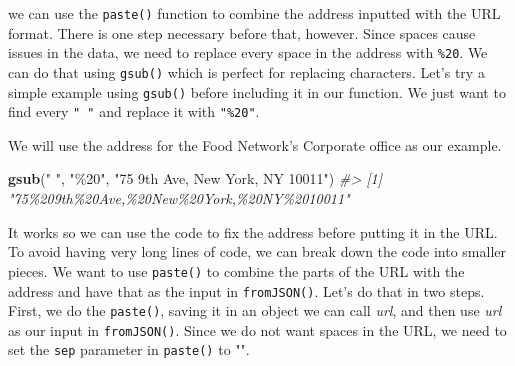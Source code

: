 \documentclass[
  12pt,
]{book}
\newenvironment{Shaded}{\begin{snugshade}}{\end{snugshade}}
\newcommand{\CommentTok}[1]{\textcolor[rgb]{0.37,0.37,0.37}{\textit{#1}}}
\newcommand{\ControlFlowTok}[1]{\textcolor[rgb]{0.27,0.27,0.27}{\textbf{#1}}}
\newcommand{\DataTypeTok}[1]{\textcolor[rgb]{0.27,0.27,0.27}{#1}}
\newcommand{\DecValTok}[1]{\textcolor[rgb]{0.06,0.06,0.06}{#1}}
\newcommand{\KeywordTok}[1]{\textcolor[rgb]{0.27,0.27,0.27}{\textbf{#1}}}
\newcommand{\NormalTok}[1]{#1}
\newcommand{\OperatorTok}[1]{\textcolor[rgb]{0.43,0.43,0.43}{\textbf{#1}}}
\newcommand{\StringTok}[1]{\textcolor[rgb]{0.5,0.5,0.5}{#1}}
\begin{document}
we can use the \texttt{paste()} function to combine the address inputted with the URL format. There is one step necessary before that, however. Since spaces cause issues in the data, we need to replace every space in the address with \texttt{\%20}. We can do that using \texttt{gsub()} which is perfect for replacing characters. Let's try a simple example using \texttt{gsub()} before including it in our function. We just want to find every \texttt{"\ "} and replace it with \texttt{"\%20"}.

We will use the address for the Food Network's Corporate office as our example.

\begin{Shaded}
\begin{Highlighting}[]
\KeywordTok{gsub}\NormalTok{(}\StringTok{" "}\NormalTok{, }\StringTok{"\%20"}\NormalTok{, }\StringTok{"75 9th Ave, New York, NY 10011"}\NormalTok{)}
\CommentTok{\#\textgreater{} [1] "75\%209th\%20Ave,\%20New\%20York,\%20NY\%2010011"}
\end{Highlighting}
\end{Shaded}

It works so we can use the code to fix the address before putting it in the URL. To avoid having very long lines of code, we can break down the code into smaller pieces. We want to use \texttt{paste()} to combine the parts of the URL with the address and have that as the input in \texttt{fromJSON()}. Let's do that in two steps. First, we do the \texttt{paste()}, saving it in an object we can call \emph{url}, and then use \emph{url} as our input in \texttt{fromJSON()}. Since we do not want spaces in the URL, we need to set the \texttt{sep} parameter in \texttt{paste()} to "".

\begin{Shaded}
\end{Shaded}
\end{document}
